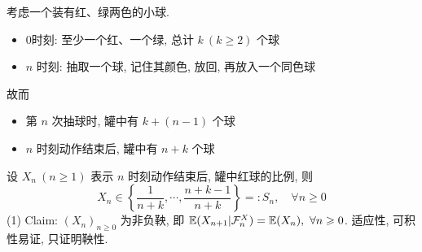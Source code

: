 \begin{example}[罐子]
    考虑一个装有红、绿两色的小球.
    \begin{itemize}
        \item 0时刻: 至少一个红、一个绿, 总计 $k\ (k\geq 2)$ 个球 
        \item $n$ 时刻: 抽取一个球, 记住其颜色, 放回, 再放入一个同色球
    \end{itemize}
    故而 \begin{itemize}
        \item 第 $n$ 次抽球时, 罐中有 $k+(n-1)$ 个球
        \item $n$ 时刻动作结束后, 罐中有 $n+k$ 个球
    \end{itemize}
\end{example}

设 $X_n\ (n\geq 1)$ 表示 $n$ 时刻动作结束后, 罐中红球的比例, 则
\[
X_n\in \left\{
    \frac{1}{n+k},\cdots, \frac{n+k-1}{n+k}
\right\}=:S_n,\quad \forall n\geq 0
\]
(1) Claim: $(X_n)_{n\geq 0}$ 为非负鞅, 即 $\EE(X_{n+1}|\CF_n^X)=\EE(X_n),\ \forall n\geq 0$. 适应性, 可积性易证, 只证明鞅性.

